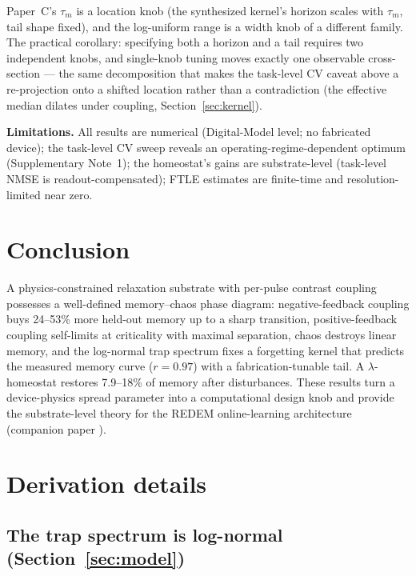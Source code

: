 \documentclass[11pt]{article}
\begin{document}
Paper~C's $\tau_m$ is a location knob (the
synthesized kernel's horizon scales with $\tau_m$, tail shape fixed),
and the log-uniform range is a width knob of a different family. The
practical corollary: specifying both a horizon and a tail requires two
independent knobs, and single-knob tuning moves exactly one observable
cross-section --- the same decomposition that makes the task-level CV
caveat above a re-projection onto a shifted location rather than a
contradiction (the effective median dilates under coupling,
Section~\ref{sec:kernel}).

\textbf{Limitations.} All results are numerical (Digital-Model level; no
fabricated device); the task-level CV sweep reveals an
operating-regime-dependent optimum (Supplementary Note~1); the homeostat's
gains are substrate-level (task-level NMSE is readout-compensated); FTLE
estimates are finite-time and resolution-limited near zero.

\section{Conclusion}
\label{sec:conclusion}

A physics-constrained relaxation substrate with per-pulse contrast coupling
possesses a well-defined memory--chaos phase diagram: negative-feedback
coupling buys 24--53\% more held-out memory up to a sharp transition,
positive-feedback coupling self-limits at criticality with maximal separation,
chaos destroys linear memory, and the log-normal trap spectrum fixes a
forgetting kernel that predicts the measured memory curve ($r=0.97$) with a
fabrication-tunable tail. A $\lambda$-homeostat restores 7.9--18\% of memory
after disturbances. These results turn a device-physics spread parameter into a
computational design knob and provide the substrate-level theory for the REDEM
online-learning architecture (companion paper \cite{companionB}).

\appendix
{}
\setcounter{equation}{0}

\section{Derivation details}
\label{app:derivations}

\subsection{The trap spectrum is log-normal (Section~\ref{sec:model})}
\label{app:spectrum}
\end{document}
